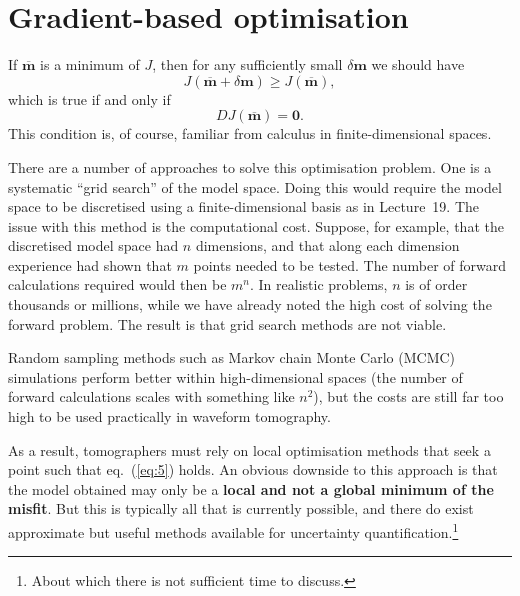 \section*{Gradient-based optimisation}
If $\overline{\mathbf{m}}$ is a minimum of $J$, then for any sufficiently small $\delta \mathbf{m}$ we should have
\begin{equation}
J(\overline{\mathbf{m}}+\delta \mathbf{m})\ge J(\overline{\mathbf{m}}),
\label{eq:4}
\end{equation}
which is true if and only if
\begin{equation}
DJ(\overline{\mathbf{m}})=\mathbf{0}.
\label{eq:5}
\end{equation}
This condition is, of course, familiar from calculus in finite-dimensional spaces. 

There are a number of approaches to solve this optimisation problem. One is a systematic ``grid search'' of the model space. 
Doing this would require the model space to be discretised using a finite-dimensional basis as in Lecture~19. The issue with 
this method is the computational cost. Suppose, for example, that the discretised model space had $n$ dimensions, and that along 
each dimension experience had shown that $m$ points needed to be tested. The number of forward calculations required would then be
$m^{n}$. In realistic problems, $n$ is of order thousands or millions, while we have already noted the high cost of solving the 
forward problem. The result is that grid search methods are not viable. 

Random sampling methods such as Markov chain Monte Carlo (MCMC) simulations perform better within high-dimensional spaces 
(the number of forward calculations scales with something like $n^{2}$), but the costs are still far too high to be used 
practically in waveform tomography. 

As a result, tomographers must rely on local optimisation methods that seek a point such that eq.~(\ref{eq:5}) holds. 
An obvious downside to this approach is that the model obtained may only be a \textbf{local and not a global minimum of 
the misfit}. But this is typically all that is currently possible, and there do exist approximate but useful methods available 
for uncertainty quantification.\footnote{About which there is not sufficient time to discuss.}

